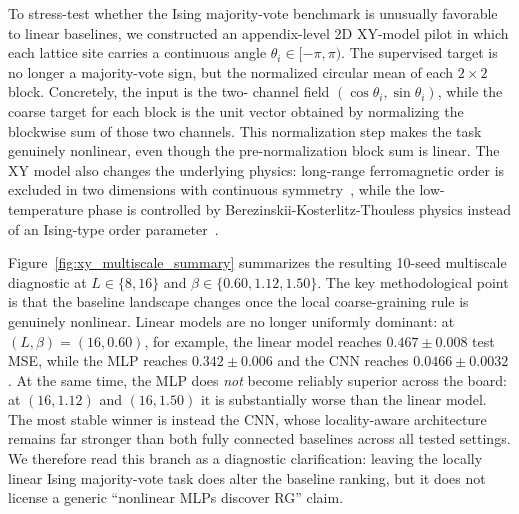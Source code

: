 \documentclass[12pt,a4paper]{memoir}
\begin{document}
To stress-test whether the Ising majority-vote benchmark is unusually favorable
to linear baselines, we constructed an appendix-level 2D XY-model pilot in
which each lattice site carries a continuous angle $\theta_i \in [-\pi,\pi)$.
The supervised target is no longer a majority-vote sign, but the normalized
circular mean of each $2\times2$ block.  Concretely, the input is the two-
channel field $(\cos \theta_i, \sin \theta_i)$, while the coarse target for
each block is the unit vector obtained by normalizing the blockwise sum of
those two channels.  This normalization step makes the task genuinely
nonlinear, even though the pre-normalization block sum is linear.  The XY model
also changes the underlying physics: long-range ferromagnetic order is excluded
in two dimensions with continuous symmetry~\citep{mermin1966}, while the low-
temperature phase is controlled by Berezinskii-Kosterlitz-Thouless physics
instead of an Ising-type order parameter~\citep{berezinskii1971,kosterlitz1973,
fernandez1986xy}.

Figure~\ref{fig:xy_multiscale_summary} summarizes the resulting 10-seed
multiscale diagnostic at $L \in \{8,16\}$ and
$\beta \in \{0.60, 1.12, 1.50\}$.  The key methodological point is that the
baseline landscape changes once the local coarse-graining rule is genuinely
nonlinear.  Linear models are no longer uniformly dominant: at
$(L,\beta)=(16,0.60)$, for example, the linear model reaches
$0.467 \pm 0.008$ test MSE, while the MLP reaches $0.342 \pm 0.006$ and the CNN
reaches $0.0466 \pm 0.0032$.  At the same time, the MLP does \emph{not} become
reliably superior across the board: at $(16,1.12)$ and $(16,1.50)$ it is
substantially worse than the linear model.  The most stable winner is instead
the CNN, whose locality-aware architecture remains far stronger than both fully
connected baselines across all tested settings.  We therefore read this branch
as a diagnostic clarification: leaving the locally linear Ising majority-vote
task does alter the baseline ranking, but it does not license a generic
``nonlinear MLPs discover RG'' claim.
\end{document}
